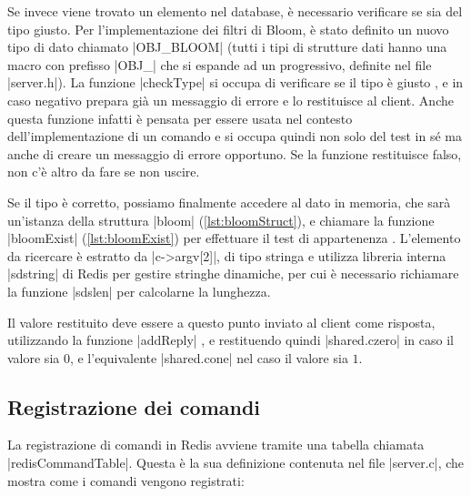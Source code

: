 Se invece viene trovato un elemento nel database, è necessario verificare se sia del tipo giusto.
Per l'implementazione dei filtri di Bloom, è stato definito un nuovo tipo di dato chiamato 
\cverb|OBJ_BLOOM| (tutti i tipi di strutture dati hanno una macro con prefisso \cverb|OBJ_| che
si espande ad un progressivo, definite nel file \cverb|server.h|). La funzione \cverb|checkType| si
occupa di verificare se il tipo è giusto , e in caso negativo prepara già un messaggio di
errore e lo restituisce al client. Anche questa funzione infatti è pensata per essere usata nel
contesto dell'implementazione di un comando e si occupa quindi non solo del test in sé ma anche di
creare un messaggio di errore opportuno. Se la funzione restituisce falso, non c'è altro da fare se
non uscire.

Se il tipo è corretto, possiamo finalmente accedere al dato in memoria, che sarà un'istanza della
struttura \cverb|bloom| (\autoref{lst:bloomStruct}), e chiamare la funzione  \cverb|bloomExist|
(\autoref{lst:bloomExist}) per effettuare il test di appartenenza . L'elemento da ricercare
è estratto da \cverb|c->argv[2]|, di tipo stringa e utilizza libreria interna \cverb|sdstring| di
Redis per gestire stringhe dinamiche, per cui è necessario richiamare la funzione \cverb|sdslen| per
calcolarne la lunghezza.

Il valore restituito deve essere a questo punto inviato al client come risposta, utilizzando
la funzione \cverb|addReply| , e restituendo quindi \cverb|shared.czero| in caso il valore
sia $0$, e l'equivalente \cverb|shared.cone| nel caso il valore sia $1$.

\subsection{Registrazione dei comandi}

La registrazione di comandi in Redis avviene tramite una tabella chiamata \cverb|redisCommandTable|.
Questa è la sua definizione contenuta nel file \cverb|server.c|, che mostra come i comandi vengono
registrati:

